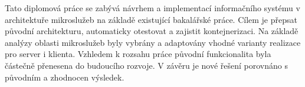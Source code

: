 Tato diplomová práce se zabývá návrhem a implementací informačního systému v architektuře mikroslužeb na základě existující bakalářské práce.
Cílem je přepsat původní architekturu, automaticky otestovat a zajistit kontejnerizaci.
Na základě analýzy oblasti mikroslužeb byly vybrány a adaptovány vhodné varianty realizace pro server i klienta.
Vzhledem k rozsahu práce původní funkcionalita byla částečně přenesena do budoucího rozvoje.
V závěru je nové řešení porovnáno s původním a zhodnocen výsledek.
